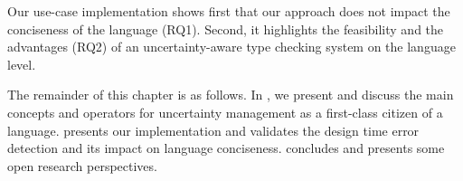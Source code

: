 Our use-case implementation shows first that our approach does not impact the conciseness of the language (RQ1).
Second, it highlights the feasibility and the advantages (RQ2) of an uncertainty-aware type checking system on the language level.

The remainder of this chapter is as follows.
In , we present and discuss the main concepts and operators for uncertainty management as a first-class citizen of a language. 
 presents our \langName{} implementation and validates the design time error detection and its impact on language conciseness. 
 concludes and presents some open research perspectives. 